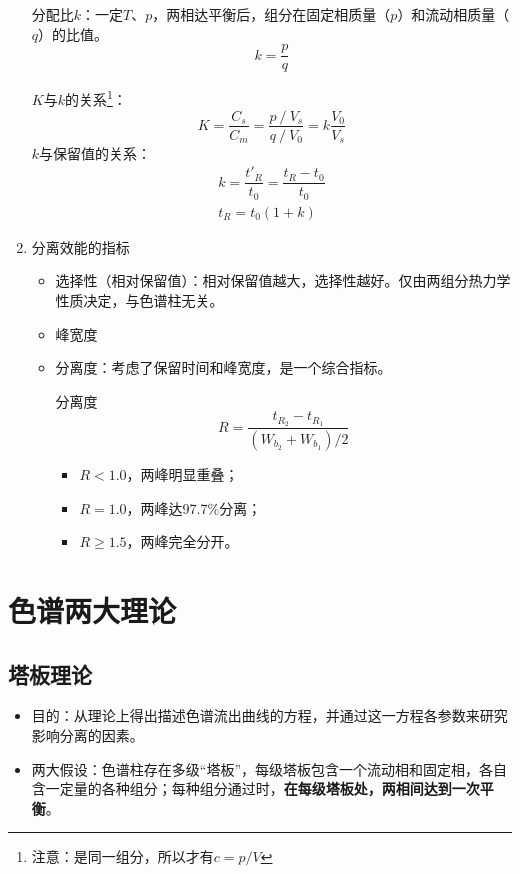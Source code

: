 \begin{enumerate}
		分配比$k$：一定$T$、$p$，两相达平衡后，组分在固定相质量（$p$）和流动相质量（$q$）的比值。
	\begin{equation*}
	k=\dfrac{p}{q}
	\end{equation*}
	
	$K$与$k$的关系\footnote{注意：是同一组分，所以才有$c=p/V$}：
	\begin{equation*}
	K=\dfrac{C_s}{C_m} =\dfrac{p⁄ V_s}{q⁄ V_0}=k \dfrac{V_0}{V_s}
	\end{equation*}
	$k$与保留值的关系：
	\begin{gather*}
		k=\dfrac{t'_R}{t_0} =\dfrac{t_R-t_0}{t_0}\\
		t_R=t_0 (1+k)		
	\end{gather*}
	
	\item 分离效能的指标
	\begin{itemize}
		\item 选择性（相对保留值）：相对保留值越大，选择性越好。仅由两组分热力学性质决定，与色谱柱无关。
		\item 峰宽度
		\item 分离度：考虑了保留时间和峰宽度，是一个综合指标。
		\begin{theorem*}{分离度}{}
			\begin{equation*}
			R=\dfrac{t_{R_2}-t_{R_1}}{(W_{b_2}+W_{b_1})/2}
			\end{equation*}
		\end{theorem*}
		
				
		\begin{itemize}
			\item $R<1.0$，两峰明显重叠；
			\item $R=1.0$，两峰达97.7\%分离；
			\item $R\geqslant 1.5$，两峰完全分开。
		\end{itemize}
	\end{itemize}
\end{enumerate}

\section{色谱两大理论}

\subsection{塔板理论}
\begin{itemize}
	\item 目的：从理论上得出描述色谱流出曲线的方程，并通过这一方程各参数来研究影响分离的因素。
	\item 两大假设：色谱柱存在多级“塔板”，每级塔板包含一个流动相和固定相，各自含一定量的各种组分；每种组分通过时，\textbf{在每级塔板处，两相间达到一次平衡}。
\end{itemize}

